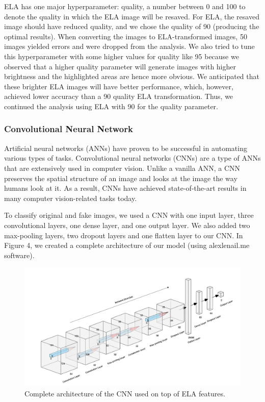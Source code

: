 \documentclass[11pt]{article}
\begin{document}
ELA has one major hyperparameter: quality, a number between 0 and 100 to denote the quality in which the ELA image will be resaved. For ELA, the resaved image should have reduced quality,  and we chose the quality of 90 (producing the optimal results). When converting the images to ELA-transformed images, 50 images yielded errors and were dropped from the analysis. We also tried to tune this hyperparameter with some higher values for quality like 95 because we observed that a higher quality parameter will generate images with higher brightness and the highlighted areas are hence more obvious. We anticipated that these brighter ELA images will have better performance, which, however, achieved lower accuracy than a 90 quality ELA transformation. Thus, we continued the analysis using ELA with 90 for the quality parameter.

\subsubsection{Convolutional Neural Network}

Artificial neural networks (ANNs) have proven to be successful in automating various types of tasks. Convolutional neural networks (CNNs) are a type of ANNs that are extensively used in computer vision. Unlike a vanilla ANN, a CNN preserves the spatial structure of an image and looks at the image the way humans look at it. As a result, CNNs have achieved state-of-the-art results in many computer vision-related tasks today.

To classify original and fake images, we used a CNN with one input layer, three convolutional layers, one dense layer, and one output layer. We also added two max-pooling layers, two dropout layers and one flatten layer to our CNN. In Figure 4, we created a complete architecture of our model (using alexlenail.me software).

\begin{figure}[!htb]
    \centering
        \includegraphics[scale=.50]{figures/figure_4.png}
    \caption{Complete architecture of the CNN used on top of ELA features.}
    \label{fig:4}
\end{figure}
\end{document}
